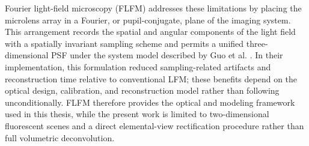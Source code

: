 Fourier light-field microscopy (FLFM) addresses these limitations by placing the microlens array in a Fourier, or pupil-conjugate, plane of the imaging system. This arrangement records the spatial and angular components of the light field with a spatially invariant sampling scheme and permits a unified three-dimensional PSF under the system model described by Guo et al. \cite{guo2019fourierLightField}. In their implementation, this formulation reduced sampling-related artifacts and reconstruction time relative to conventional LFM; these benefits depend on the optical design, calibration, and reconstruction model rather than following unconditionally. FLFM therefore provides the optical and modeling framework used in this thesis, while the present work is limited to two-dimensional fluorescent scenes and a direct elemental-view rectification procedure rather than full volumetric deconvolution.
